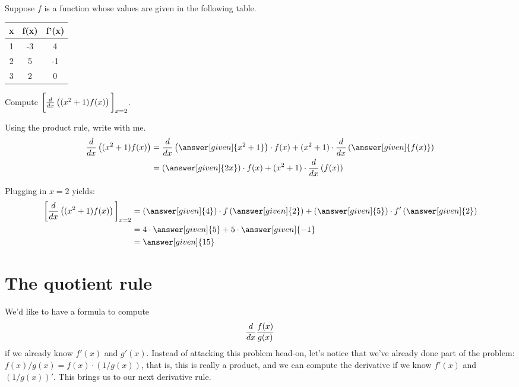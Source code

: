 \documentclass{ximera}
\begin{document}
\begin{example}
	Suppose $f$ is a function whose values are given in the following table.
	\begin{center}
		\begin{tabular}{c c c}
			\hline \hline
			x & f(x) & f'(x) \\ 
			\hline
			1 & -3 & 4\\
			2 & 5 & -1\\
			3 & 2 & 0\\
			\hline
		\end{tabular}		
	\end{center}
		
	Compute $\bigg[  \frac{d}{\mathop{}\!d x}\left( (x^2+1) f(x) \right) \bigg]_{x=2}$.
	\begin{explanation}
	Using the product rule, write with me.
	\begin{align*}
		\ddx\left( (x^2+1) f(x) \right) &= \ddx \left( \answer[given]{x^2+1} \right) \cdot f(x) + (x^2+1) \cdot \ddx\left( \answer[given]{f(x)} \right) \\
			&= \left( \answer[given]{2x} \right) \cdot f(x) + (x^2+1) \cdot \ddx \left( f(x) \right)
	\end{align*}
	
	Plugging in $x=2$ yields:
	\begin{align*}
		\eval{ \ddx\left( (x^2+1) f(x) \right) }_{x=2} &= \left( \answer[given]{4} \right) \cdot f\left( \answer[given]{2} \right) + \left( \answer[given]{5} \right) \cdot f'\left( \answer[given]{2} \right)\\	
			&= 4 \cdot \answer[given]{5} + 5 \cdot \answer[given]{-1}\\
			&= \answer[given]{15}
	\end{align*}
	\end{explanation}
\end{example}



\section{The quotient rule}


We'd like to have a formula to compute
\[
\frac{d}{\mathop{}\!d x} \frac{f(x)}{g(x)}
\]
if we already know $f'(x)$ and $g'(x)$. Instead of attacking this
problem head-on, let's notice that we've already done part of the
problem: $f(x)/g(x)= f(x)\cdot(1/g(x))$, that is, this is really a
product, and we can compute the derivative if we know $f'(x)$ and
$(1/g(x))'$. This brings us to our next derivative rule.
\end{document}
